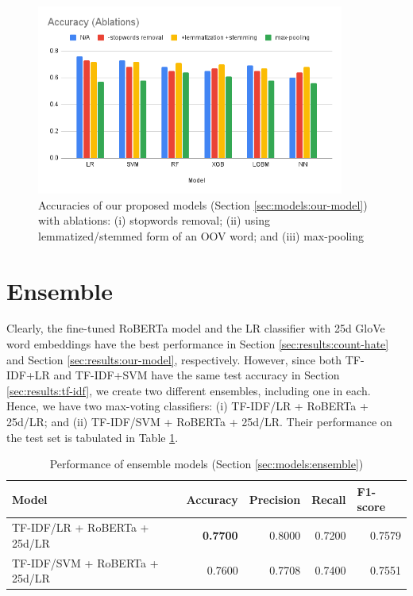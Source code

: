 \begin{figure}[htbp]
    \centering
    \includegraphics[width=0.9\textwidth]{assets/img/our-model_ablations.png}
    \caption{Accuracies of our proposed models (Section \ref{sec:models:our-model}) with ablations: (i) stopwords removal; (ii) using lemmatized/stemmed form of an OOV word; and (iii) max-pooling}
    \label{fig:results:performance-our-model:abl}
\end{figure}

\section{Ensemble}
\label{sec:results:ensemble}
Clearly, the fine-tuned \ac{RoBERTa} model and the \ac{LR} classifier with 25d \ac{GloVe} word embeddings have the best performance in Section \ref{sec:results:count-hate} and Section \ref{sec:results:our-model}, respectively. However, since both \ac{TF-IDF}+\ac{LR} and \ac{TF-IDF}+\ac{SVM} have the same test accuracy in Section \ref{sec:results:tf-idf}, we create two different ensembles, including one in each. Hence, we have two max-voting classifiers: (i) \ac{TF-IDF}/\ac{LR} + \ac{RoBERTa} + 25d/\ac{LR}; and (ii) \ac{TF-IDF}/\ac{SVM} + \ac{RoBERTa} + 25d/\ac{LR}. Their performance on the test set is tabulated in Table \ref{tab:results:performance-ensemble}. 

\begin{table}[htbp]
\centering
\begin{tabular}{lrrrr}
\hline
\textbf{Model} & \multicolumn{1}{l}{\textbf{Accuracy}} & \multicolumn{1}{l}{\textbf{Precision}} & \multicolumn{1}{l}{\textbf{Recall}} & \multicolumn{1}{l}{\textbf{F1-score}} \\ \hline
TF-IDF/LR + RoBERTa + 25d/LR & \textbf{0.7700} & 0.8000 & 0.7200 & {0.7579} \\
TF-IDF/SVM + RoBERTa + 25d/LR & 0.7600 & 0.7708 & 0.7400 & 0.7551 \\ \hline
\end{tabular}
\caption{Performance of ensemble models (Section \ref{sec:models:ensemble})}
\label{tab:results:performance-ensemble}
\end{table}

